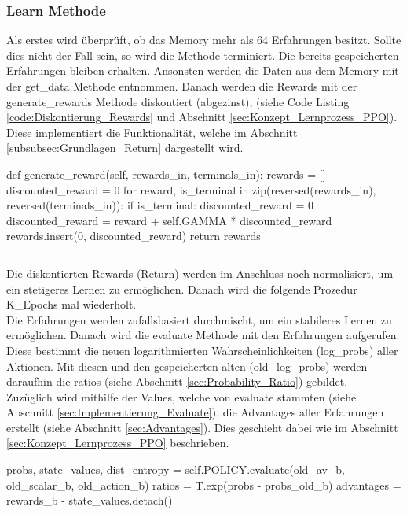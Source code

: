 \subsubsection{Learn Methode} \label{sec:Implementierung_learn_PPO}
Als erstes wird überprüft, ob das Memory mehr als 64 Erfahrungen besitzt. Sollte dies nicht der Fall sein, so wird die Methode terminiert. 
Die bereits gespeicherten Erfahrungen bleiben erhalten.
Ansonsten werden die Daten aus dem Memory mit der get\_data Methode entnommen.
Danach werden die Rewards mit der generate\_rewards Methode diskontiert (abgezinst), (siehe Code Listing \ref{code:Diskontierung_Rewards} und Abschnitt \ref{sec:Konzept_Lernprozess_PPO}). Diese implementiert die Funktionalität, welche im Abschnitt \ref{subsubsec:Grundlagen_Return} dargestellt wird.
\begin{python}
def generate_reward(self, rewards_in, terminals_in):
	rewards = []
	discounted_reward = 0
	for reward, is_terminal in zip(reversed(rewards_in), reversed(terminals_in)):
		if is_terminal:
			discounted_reward = 0
		discounted_reward = reward + self.GAMMA * discounted_reward
		rewards.insert(0, discounted_reward)
	return rewards
\end{python}
\begin{lstlisting}[caption=Diskontierung der Rewards, label=code:Diskontierung_Rewards]
\end{lstlisting}
Die diskontierten Rewards (Return) werden im Anschluss noch normalisiert, um ein stetigeres Lernen zu ermöglichen.
Danach wird die folgende Prozedur K\_Epochs mal wiederholt.\\
Die Erfahrungen werden zufallsbasiert durchmischt, um ein stabileres Lernen zu ermöglichen. 
Danach wird die evaluate Methode mit den Erfahrungen aufgerufen. Diese bestimmt die neuen logarithmierten Wahrscheinlichkeiten (log\_probs) aller Aktionen. Mit diesen und den gespeicherten alten (old\_log\_probs) werden daraufhin die ratios (siehe Abschnitt \ref{sec:Probability_Ratio}) gebildet.\\
Zuzüglich wird mithilfe der Values, welche von evaluate stammten (siehe Abschnitt \ref{sec:Implementierung_Evaluate}), die Advantages aller Erfahrungen erstellt (siehe Abschnitt \ref{sec:Advantages}). Dies geschieht dabei wie im Abschnitt \ref{sec:Konzept_Lernprozess_PPO} beschrieben.
\begin{python}		
probs, state_values, dist_entropy = self.POLICY.evaluate(old_av_b, old_scalar_b, old_action_b)	
ratios = T.exp(probs - probs_old_b)	
advantages = rewards_b - state_values.detach()
\end{python}
